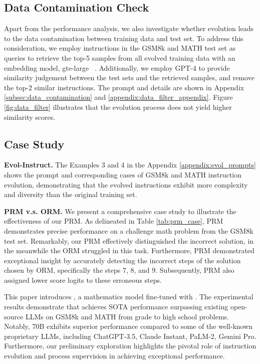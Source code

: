 \subsection{Data Contamination Check}
Apart from the performance analysis, we also investigate whether evolution leads to the data contamination between training data and test set. To address this consideration,   we employ instructions in the  GSM8k and MATH test set as queries to retrieve the top-5 samples from all evolved training data with an   embedding model, gte-large ~\citep{Li2023TowardsGT}.
Additionally, we employ GPT-4  to provide similarity judgement between the test sets and the retrieved samples, and remove the top-2 similar instructions. The prompt and details are shown in Appendix \ref{subsec:data_contamination} and \ref{appendix:data_filter_appendix}. Figure \ref{fig:data_filter} illustrates that the evolution process does not yield higher similarity scores. 

\subsection{Case Study}
\vspace{-0.1cm}
\textbf{Evol-Instruct.} The Examples 3 and 4 in the Appendix \ref{appendix:evol_prompts} shows the prompt and corresponding cases of GSM8k and MATH instruction evolution, demonstrating that the evolved instructions exhibit more complexity and diversity than the original training set.

\textbf{PRM v.s. ORM.} We present a comprehensive case study to  illustrate the effectiveness of our PRM. As delineated in Table \ref{tab:prm_case}, PRM demonstrates precise performance on a challenge math problem from the GSM8k test set. Remarkably, our PRM effectively distinguished the incorrect solution, in the meanwhile the ORM struggled in this task. Furthermore, PRM demonstrated exceptional insight by accurately detecting the incorrect steps of the solution chosen by ORM, specifically the steps 7, 8, and 9. Subsequently, PRM also assigned lower score logits to these erroneous steps.

		
 

This paper introduces \modelname{}, a mathematics model fine-tuned with \textbf{\REInameS{}}. The experimental results demonstrate that \modelname{} achieves SOTA performance surpassing existing open-source LLMs on  GSM8k and MATH from grade to high school problems. Notably,  \modelname{} 70B exhibits superior performance compared to some of the well-known proprietary  LLMs, including ChatGPT-3.5, Claude Instant, PaLM-2, Gemini Pro. Furthermore, our preliminary exploration highlights the pivotal role of instruction evolution and process supervision in achieving exceptional performance.

\clearpage

\newpage

